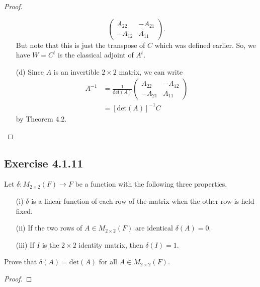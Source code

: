 \begin{proof}
\begin{enumerate}
\[\begin{pmatrix}
            {A}_{22} &  - {A}_{21} \\
            - {A}_{12} & {A}_{11}
        \end{pmatrix}. \]
        But note that this is just the transpose of \( C  \) which was defined earlier. So, we have \( W = C^{t} \) is the classical adjoint of \( A^{t} \). 
    \item[(d)] Since \( A \) is an invertible \( 2 \times 2 \) matrix, we can write
        \begin{align*}
            A^{-1} &= \frac{ 1 }{ \text{det}(A) } \begin{pmatrix}
                {A}_{22} & - {A}_{12} \\
                -{A}_{21} & {A}_{11}
            \end{pmatrix} \\
                   &= [\text{det}(A)]^{-1} C 
        \end{align*}
        by Theorem 4.2.
\end{enumerate}
\end{proof}

\subsection*{Exercise 4.1.11} Let \( \delta: {M}_{2 \times 2}(F) \to F  \) be a function with the following three properties.
\begin{enumerate}
    \item[(i)] \( \delta \) is a linear function of each row of the matrix when the other row is held fixed.
    \item[(ii)] If the two rows of \( A \in {M}_{2 \times 2}(F)  \) are identical \( \delta(A) = 0  \).
    \item[(iii)] If \( I  \) is the \( 2 \times 2  \) identity matrix, then \( \delta(I) = 1  \).
\end{enumerate}
Prove that \( \delta(A) = \text{det}(A)  \) for all \( A \in {M}_{2 \times 2}(F)  \). 
\begin{proof}

\end{proof}
